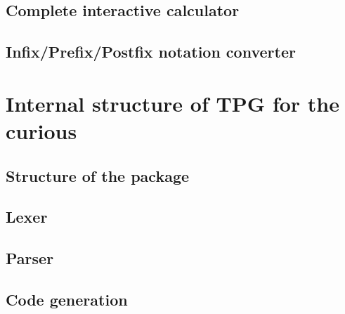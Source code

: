 \documentclass[a4paper,twoside]{report}
\begin{document}
	\chapter{Complete interactive calculator}
		
	\chapter{Infix/Prefix/Postfix notation converter}
		

\cleardoublepage
\part{Internal structure of TPG for the curious}			\label{tpg:hack}
	\chapter{Structure of the package}
		
	\chapter{Lexer}
		
	\chapter{Parser}
		
	\chapter{Code generation}
		
\end{document}
